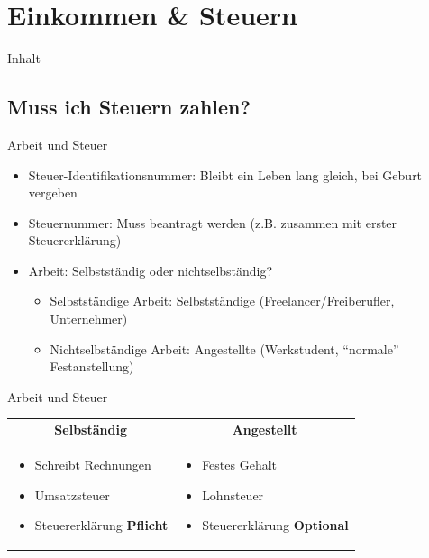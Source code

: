 \documentclass{beamer}
\begin{document}
	\section{Einkommen \& Steuern}
	
		\begin{frame}[t]{Inhalt}
		\end{frame}
	
		\subsection{Muss ich Steuern zahlen?}
		
			\begin{frame}{Arbeit und Steuer}
				\begin{itemize}
					\item Steuer-Identifikationsnummer: Bleibt ein Leben lang gleich, bei Geburt vergeben
					\item Steuernummer: Muss beantragt werden (z.B. zusammen mit erster Steuererklärung)
					\item Arbeit: Selbstständig oder nichtselbständig?
					\begin{itemize}
						\item Selbstständige Arbeit: Selbstständige (Freelancer/Freiberufler, Unternehmer)
						\item Nichtselbständige Arbeit: Angestellte (Werkstudent, "`normale"' Festanstellung)
					\end{itemize}
				\end{itemize}
			\end{frame}
		
			\begin{frame}{Arbeit und Steuer}
				\begin{tabularx}{\linewidth}{X|X}
					\multicolumn{1}{c|}{\textbf{Selbständig}\citewiki{Selbständigkeit\_(beruflich)\#Steuerrecht}} &
					\multicolumn{1}{c}{\textbf{Angestellt}} \\[0.25cm]
					\begin{itemize}
						\item Schreibt Rechnungen
						\item Umsatzsteuer
						\item Steuererklärung \textbf{Pflicht}
					\end{itemize} &
					\begin{itemize}
						\item Festes Gehalt
						\item Lohnsteuer
						\item Steuererklärung \textbf{Optional}
					\end{itemize}
				\end{tabularx}
			\end{frame}
		
\end{document}
